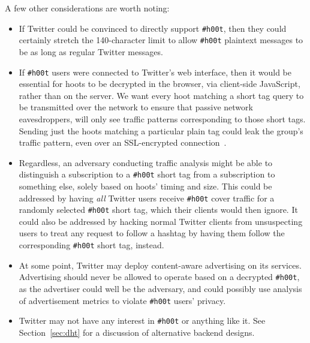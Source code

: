 \documentclass{sig-alternate-arxiv}
\newcommand{\hoot}{{\tt \#h00t}\xspace}
\newcommand{\msg}{hoot\xspace}
\newcommand{\msgs}{hoots\xspace}
\begin{document}
A few other considerations are worth noting:
\begin{itemize}
\item If Twitter could be convinced to directly support \hoot, then they could certainly stretch the 140-character limit to allow \hoot plaintext messages to be as long as regular Twitter messages.

\item If \hoot users were connected to Twitter's web interface, then it would be essential for \msgs to be decrypted in the browser, via client-side JavaScript, rather than on the server. We want every \msg matching a short tag query to be transmitted over the network to ensure that passive network eavesdroppers, will only see traffic patterns corresponding to those short tags. Sending just the \msgs matching a particular plain tag could leak the group's traffic pattern, even over an SSL-encrypted connection~\cite{liberatore06}.


\item Regardless, an adversary conducting traffic analysis might be able to distinguish a subscription to a \hoot short tag from a subscription to something else, solely based on \msgs' timing and size. This could be addressed by having {\em all} Twitter users receive \hoot cover traffic for a randomly selected \hoot short tag, which their clients would then ignore. It could also be addressed by hacking normal Twitter clients from unsuspecting users to treat any request to follow a hashtag by having them follow the corresponding \hoot short tag, instead.

\item At some point, Twitter may deploy content-aware advertising on its services. Advertising should never be allowed to operate based on a decrypted \hoot, as the advertiser could well be the adversary, and could possibly use analysis of advertisement metrics to violate \hoot users' privacy.

\item Twitter may not have any interest in \hoot or anything like it. See Section~\ref{sec:dht} for a discussion of alternative backend designs.

\end{itemize}
\end{document}
